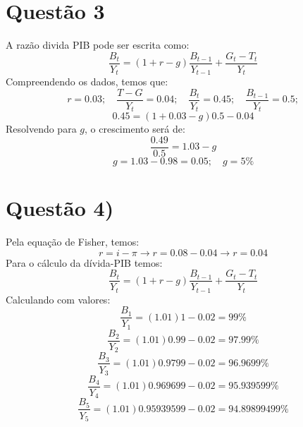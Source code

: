 \documentclass{article}
\begin{document}
\section*{Questão 3}
A razão divida PIB pode ser escrita como:
\begin{equation}
    \frac{B_t}{Y_t} = (1+r-g)\frac{B_{t-1}}{Y_{t-1}}+\frac{G_t-T_t}{Y_t}
\end{equation}
Compreendendo os dados, temos que:
$$r=0.03; \quad \frac{T-G}{Y_t}=0.04; \quad \frac{B_t}{Y_t}=0.45; \quad \frac{B_{t-1}}{Y_t}=0.5;$$
\begin{equation}
    0.45 = (1+0.03-g)0.5-0.04
\end{equation}
Resolvendo para $g$, o crescimento será de:
\begin{equation}
    \frac{0.49}{0.5}=1.03-g
\end{equation}
\begin{equation}
    g=1.03-0.98=0.05; \quad g=5\%
\end{equation}
\section*{Questão 4)}
Pela equação de Fisher, temos:
\begin{equation}
    r=i-\pi \to r = 0.08-0.04 \to r=0.04
\end{equation}
Para o cálculo da dívida-PIB temos:
\begin{equation}
    \frac{B_t}{Y_t} = (1+r-g)\frac{B_{t-1}}{Y_{t-1}}+\frac{G_t-T_t}{Y_t}
\end{equation}
Calculando com valores:
\begin{equation}
    \frac{B_1}{Y_1} = (1.01)1-0.02 = 99\%
\end{equation}
\begin{equation}
    \frac{B_2}{Y_2} = (1.01)0.99-0.02 = 97.99\%
\end{equation}
\begin{equation}
    \frac{B_3}{Y_3} = (1.01)0.9799-0.02 = 96.9699\%
\end{equation}
\begin{equation}
    \frac{B_4}{Y_4} = (1.01)0.969699-0.02 = 95.939599\%
\end{equation}
\begin{equation}
    \frac{B_5}{Y_5} = (1.01)0.95939599-0.02 = 94.89899499\%
\end{equation}
\end{document}
